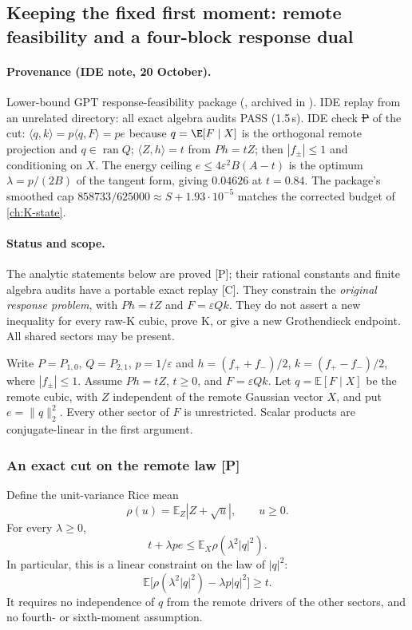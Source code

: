 \subsection{Keeping the fixed first moment: remote feasibility and a four-block response dual}
\label{sec:fixed-first-remote-feasibility}
\paragraph{Provenance (IDE note, 20 October).} Lower-bound GPT response-feasibility package (, archived in
). IDE replay  from an unrelated directory: all exact algebra audits PASS (1.5\,s).
IDE check \st{P} of the cut: $\langle q,k\rangle=p\langle q,F\rangle=pe$ because $q=\E[F\mid X]$ is the orthogonal remote projection and $q\in\operatorname{ran}Q$;
$\langle Z,h\rangle=t$ from $Ph=tZ$; then $|f_\pm|\le1$ and conditioning on $X$. The energy ceiling $e\le4\varepsilon^2B(A-t)$ is the optimum $\lambda=p/(2B)$ of the
tangent form, giving $0.04626$ at $t=0.84$. The package's smoothed cap $858733/625000\approx S+1.93\cdot10^{-5}$ matches the corrected budget of \autoref{ch:K-state}.

\paragraph{Status and scope.}
The analytic statements below are proved [P]; their rational constants and
finite algebra audits have a portable exact replay [C]. They constrain the
\emph{original response problem}, with $Ph=tZ$ and $F=\varepsilon Qk$.
They do not assert a new inequality for every raw-K cubic, prove K, or
give a new Grothendieck endpoint. All shared sectors may be present.

Write $P=P_{1,0}$, $Q=P_{2,1}$, $p=1/\varepsilon$ and
$h=(f_++f_-)/2$, $k=(f_+-f_-)/2$, where $|f_\pm|\le1$.
Assume $Ph=tZ$, $t\ge0$, and $F=\varepsilon Qk$.
Let $q=\mathbb E[F\mid X]$ be the remote cubic, with $Z$ independent of
the remote Gaussian vector $X$, and put $e=\|q\|_2^2$.
Every other sector of $F$ is unrestricted. Scalar products are
conjugate-linear in the first argument.

\subsubsection{An exact cut on the remote law [P]}
Define the unit-variance Rice mean
\[
 \rho(u)=\mathbb E_Z|Z+\sqrt u|,\qquad u\ge0.
\]
For every $\lambda\ge0$,
\begin{equation}\label{eq:remote-feasibility-cut}
 \boxed{\quad t+\lambda pe\le
       \mathbb E_X\rho(\lambda^2|q|^2).\quad}
\end{equation}
In particular, this is a linear constraint on the law of $|q|^2$:
\[
 \mathbb E\bigl[\rho(\lambda^2|q|^2)-\lambda p|q|^2\bigr]\ge t.
\]
It requires no independence of $q$ from the remote drivers of the other
sectors, and no fourth- or sixth-moment assumption.

